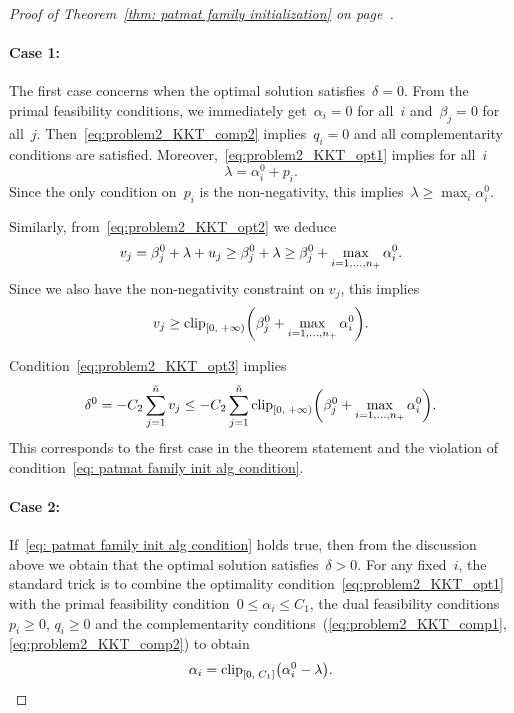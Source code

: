 \begin{proof}[Proof of Theorem~\ref{thm: patmat family initialization} on page~\pageref{thm: patmat family initialization}]
  \paragraph*{Case 1:} The first case concerns when the optimal solution satisfies~$\delta=0$. From the primal feasibility conditions, we immediately get~$\alpha_i = 0$ for all~$i$ and~$\beta_j = 0$ for all~$j$. Then~\eqref{eq:problem2_KKT_comp2} implies~$q_i=0$ and all complementarity conditions are satisfied. Moreover,~\eqref{eq:problem2_KKT_opt1} implies for all~$i$
  \begin{equation*}
    \lambda = \alpha_i^0 + p_i.
  \end{equation*}
  Since the only condition on~$p_i$ is the non-negativity, this implies~$\lambda \ge \max_i \alpha_i^0$.
  
  Similarly, from~\eqref{eq:problem2_KKT_opt2} we deduce
  \begin{equation*}
    v_j
      = \beta_j^0 +\lambda + u_j
      \ge \beta_j^0 + \lambda
      \ge \beta_j^0 + \max_{i=1,\dots,n_{+}} \alpha_i^0.
  \end{equation*}
  Since we also have the non-negativity constraint on $v_j$, this implies
  \begin{equation*}
    v_j \ge \clip[u]{0}{+\infty}{\beta_j^0 + \max_{i=1,\dots,\npos} \alpha_i^0}.
  \end{equation*}
  
  Condition~\eqref{eq:problem2_KKT_opt3} implies
  \begin{equation*}
    \delta^0
      = -C_2 \sum_{j = 1}^{\ntil} v_j
      \le -C_2 \sum_{j = 1}^{\ntil} \clip[u]{0}{+\infty}{\beta_j^0 + \max_{i=1,\dots,\npos} \alpha_i^0}.
  \end{equation*}
  This corresponds to the first case in the theorem statement and the violation of condition~\eqref{eq: patmat family init alg condition}.

  \paragraph*{Case 2:} If~\eqref{eq: patmat family init alg condition} holds true, then from the discussion above we obtain that the optimal solution satisfies~$\delta > 0$. For any fixed~$i$, the standard trick is to combine the optimality condition~\eqref{eq:problem2_KKT_opt1} with the primal feasibility condition~$0 \le \alpha_i \le C_1$, the dual feasibility conditions~$p_i \ge 0$, $q_i \ge 0$ and the complementarity conditions~(\ref{eq:problem2_KKT_comp1}, \ref{eq:problem2_KKT_comp2}) to obtain
  \begin{equation}\label{eq:problem2_alpha}
    \alpha_i = \clip{0}{C_1}{\alpha_i^0 - \lambda}.
  \end{equation}


\end{proof}
